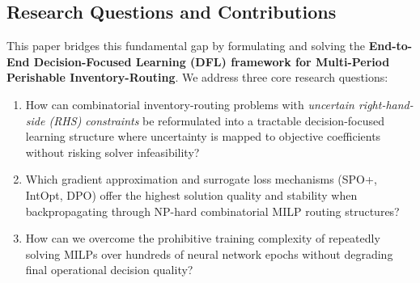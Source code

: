 \documentclass[11pt,a4paper]{article}
\theoremstyle{definition}
\theoremstyle{remark}
\begin{document}
\subsection{Research Questions and Contributions}
This paper bridges this fundamental gap by formulating and solving the \textbf{End-to-End Decision-Focused Learning (DFL) framework for Multi-Period Perishable Inventory-Routing}. We address three core research questions:
\begin{enumerate}[label=\textbf{RQ\arabic*.}]
    \item How can combinatorial inventory-routing problems with \textit{uncertain right-hand-side (RHS) constraints} be reformulated into a tractable decision-focused learning structure where uncertainty is mapped to objective coefficients without risking solver infeasibility?
    \item Which gradient approximation and surrogate loss mechanisms (SPO+, IntOpt, DPO) offer the highest solution quality and stability when backpropagating through NP-hard combinatorial MILP routing structures?
    \item How can we overcome the prohibitive training complexity of repeatedly solving MILPs over hundreds of neural network epochs without degrading final operational decision quality?
\end{enumerate}
\end{document}
